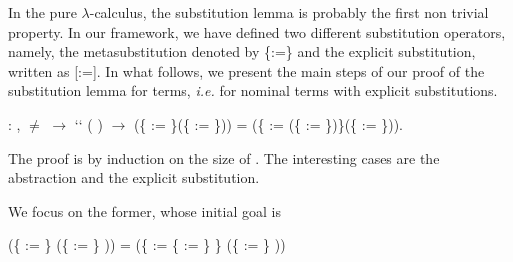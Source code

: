  In the pure $\lambda$-calculus, the substitution lemma is probably the first non trivial property. In our framework, we have defined two different substitution operators, namely, the metasubstitution denoted by \{:=\} and the explicit substitution, written as [:=]. In what follows, we present the main steps of our proof of the substitution lemma for  terms, {\it i.e.} for nominal terms with explicit substitutions. 
\begin{coqdoccode}
\coqdocemptyline
\coqdocnoindent
{} : \coqdockw{\ensuremath{\forall}}     ,  \ensuremath{\not=}  \ensuremath{\rightarrow}  `` ( ) \ensuremath{\rightarrow}\coqdoceol
\coqdocindent{10.50em}
(\{ := \}(\{ := \})) = (\{ := (\{ := \})\}(\{ := \})).\coqdoceol
\end{coqdoccode}
 The proof is by induction on the size of . The interesting cases are the abstraction and the explicit substitution.
\begin{coqdoccode}
\end{coqdoccode}
We focus on the former, whose initial goal is


(\{ := \} (\{ := \}   )) = (\{ := \{ := \} \} (\{ := \}   ))


